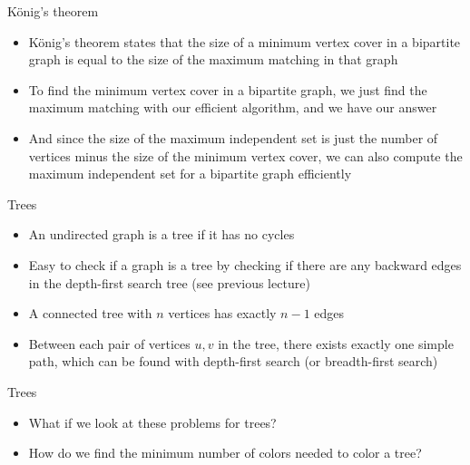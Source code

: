 \documentclass[10pt]{beamer}
\newcommand{\bi}{\begin{itemize}}
\newcommand{\ei}{\end{itemize}}
\begin{document}
\begin{frame}{König's theorem}
    \bi
        \item König's theorem states that the size of a minimum vertex cover in a bipartite graph is equal to the size of the maximum matching in that graph
        \vspace{10pt}
        \item To find the minimum vertex cover in a bipartite graph, we just find the maximum matching with our efficient algorithm, and we have our answer
        \item And since the size of the maximum independent set is just the number of vertices minus the size of the minimum vertex cover, we can also compute the maximum independent set for a bipartite graph efficiently
    \ei
\end{frame}

\begin{frame}{Trees}
    \bi
\item An undirected graph is a tree if it has no cycles
    \vspace{10pt}
\item Easy to check if a graph is a tree by checking if there are any backward edges in the depth-first search tree (see previous lecture)
\vspace{10pt}
\item A connected tree with $n$ vertices has exactly $n-1$ edges
\vspace{10pt}
\item Between each pair of vertices $u,v$ in the tree, there exists exactly one simple path, which can be found with depth-first search (or breadth-first search)
    \ei
\end{frame}

\begin{frame}{Trees}
    \bi
\item What if we look at these problems for trees?
    \vspace{10pt}
\item How do we find the minimum number of colors needed to color a tree?

    \ei
\end{frame}
\end{document}
